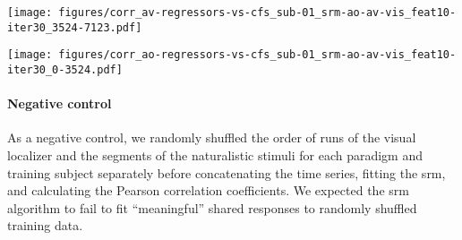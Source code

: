 \begin{figure*}[tbp]
\centering
\texttt{[image: figures/corr\_av-regressors-vs-cfs\_sub-01\_srm-ao-av-vis\_feat10-iter30\_3524-7123.pdf]}
\caption{
%
\textbf{Pearson correlation coefficients between regressors of the movie
and shared features}
%
The time series of the shared features within the multi-paradigm \ac{cfs}
%
(as calculated for subject 01 in the first fold of the cross-validation)
%
were trimmed to match the corresponding \acp{tr} of the movie
\citep{hanke2016simultaneous}.
%
The regressors \texttt{vse\_new} to \texttt{vno\_cut} are based on
annotations movie frames, whereas the regressors
\texttt{fg\_av\_ger\_lr} to \texttt{fg\_av\_ger\_ud} represent low-level
visual or auditory confounds
\citep[cf. Table 3 in][]{haeusler2022processing}.
}
\label{fig:corr-av-reg-srm}
\end{figure*}


\begin{figure*}[tbp]
\centering
\texttt{[image: figures/corr\_ao-regressors-vs-cfs\_sub-01\_srm-ao-av-vis\_feat10-iter30\_0-3524.pdf]}
\caption{
%
\textbf{Pearson correlation coefficients between regressors of the
audio-description and shared features.}
%
The time series of the shared features within the multi-paradigm \ac{cfs}
%
(as calculated for subject 01 in the first fold of the cross-validation)
%
were trimmed to match the corresponding \acp{tr} of the
audio-description \citep{hanke2014audiomovie}.
%
The regressors \texttt{body} to \texttt{sex\_m} are based on
annotations of nouns spoken by the audio-description's narrator,
whereas the regressors \texttt{fg\_ad\_ger\_lrdiff} and
\texttt{fg\_ad\_ger\_rms} represent low-level auditory confounds
\citep[cf. Table 3 in][]{haeusler2022processing}.
%
\texttt{geo\&groom} is a combination of
regressors as used on the positive side of the primary contrasts aimed to
localize the \ac{ppa} \citep[cf. Table 5 in][]{haeusler2022processing}.
}
\label{fig:corr-ao-reg-srm}
\end{figure*}


\paragraph{Negative control}


As a negative control, we randomly shuffled the order of runs of the visual
localizer and the segments of the naturalistic stimuli for each paradigm and
training subject separately before concatenating the time series, fitting the
\ac{srm}, and calculating the Pearson correlation coefficients.
%
We expected the \ac{srm} algorithm to fail to fit ``meaningful'' 
shared responses to randomly shuffled training data.


